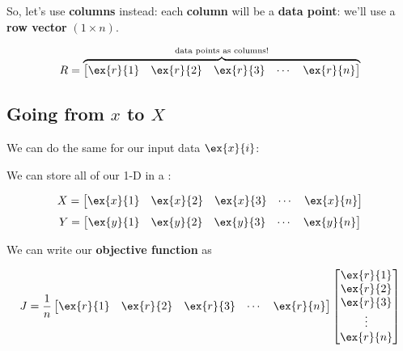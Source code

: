         So, let's use \textbf{columns} instead: each \textbf{column} will be a \textbf{data point}: we'll use a \textbf{row vector} $(1 \times n)$. 
        
        \begin{equation}
            R =
            \overbrace{
            \begin{bmatrix}
              \ex{r}{1} & \ex{r}{2} & \ex{r}{3} & \cdots & \ex{r}{n} 
            \end{bmatrix}
            }^{\text{data points as columns!}}
        \end{equation}
        
    \subsection*{Going from $x$ to $X$}
    
        We can do the same for our input data $\ex{x}{i}$:\\
        
        \begin{notation}
            We can store all of our 1-D  in a :
            
            \begin{equation*}
                X =
                \begin{bmatrix}
                  \ex{x}{1} & \ex{x}{2} & \ex{x}{3} & \cdots & \ex{x}{n}
                \end{bmatrix}
            \end{equation*}
            \begin{equation*}
                Y =
                \begin{bmatrix}
                  \ex{y}{1} & \ex{y}{2} & \ex{y}{3} & \cdots & \ex{y}{n}
                \end{bmatrix}
            \end{equation*}
        \end{notation}
        
        We can write our \textbf{objective function} as
        
        \begin{equation}
            J = 
            \frac{1}{n}
            \begin{bmatrix}
              \ex{r}{1} & \ex{r}{2} & \ex{r}{3} & \cdots & \ex{r}{n}
            \end{bmatrix}
            \begin{bmatrix}
              \ex{r}{1} \\ \ex{r}{2} \\ \ex{r}{3} \\ \vdots \\ \ex{r}{n}
            \end{bmatrix}
        \end{equation}
        
